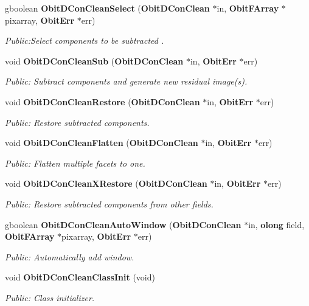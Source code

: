 \begin{CompactItemize}
gboolean {\bf Obit\-DCon\-Clean\-Select} ({\bf Obit\-DCon\-Clean} $\ast$in, {\bf Obit\-FArray} $\ast$pixarray, {\bf Obit\-Err} $\ast$err)
\begin{CompactList}\small\item\em Public:Select components to be subtracted . \item\end{CompactList}\item 
void {\bf Obit\-DCon\-Clean\-Sub} ({\bf Obit\-DCon\-Clean} $\ast$in, {\bf Obit\-Err} $\ast$err)
\begin{CompactList}\small\item\em Public: Subtract components and generate new residual image(s). \item\end{CompactList}\item 
void {\bf Obit\-DCon\-Clean\-Restore} ({\bf Obit\-DCon\-Clean} $\ast$in, {\bf Obit\-Err} $\ast$err)
\begin{CompactList}\small\item\em Public: Restore subtracted components. \item\end{CompactList}\item 
void {\bf Obit\-DCon\-Clean\-Flatten} ({\bf Obit\-DCon\-Clean} $\ast$in, {\bf Obit\-Err} $\ast$err)
\begin{CompactList}\small\item\em Public: Flatten multiple facets to one. \item\end{CompactList}\item 
void {\bf Obit\-DCon\-Clean\-XRestore} ({\bf Obit\-DCon\-Clean} $\ast$in, {\bf Obit\-Err} $\ast$err)
\begin{CompactList}\small\item\em Public: Restore subtracted components from other fields. \item\end{CompactList}\item 
gboolean {\bf Obit\-DCon\-Clean\-Auto\-Window} ({\bf Obit\-DCon\-Clean} $\ast$in, {\bf olong} field, {\bf Obit\-FArray} $\ast$pixarray, {\bf Obit\-Err} $\ast$err)
\begin{CompactList}\small\item\em Public: Automatically add window. \item\end{CompactList}\item 
void {\bf Obit\-DCon\-Clean\-Class\-Init} (void)
\begin{CompactList}\small\item\em Public: Class initializer. \item\end{CompactList}\end{CompactItemize}


